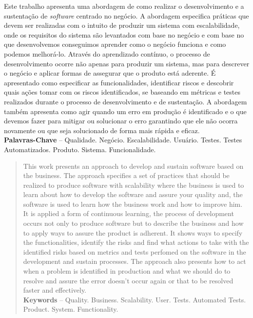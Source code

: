 \begin{resumo}
  Este trabalho apresenta uma abordagem de como realizar o desenvolvimento e
  a sustentação de \textit{software} centrado no negócio. A abordagem especifica
  práticas que devem ser realizadas com o intuito de produzir um sistema com
  escalabilidade, onde os requisitos do sistema são levantados com base no negócio
  e com base no que desenvolvemos conseguimos aprender como o negócio funciona e
  como podemos melhorá-lo. Através do aprendizado contínuo, o processo de
  desenvolvimento ocorre não apenas para produzir um sistema, mas para descrever
  o negócio e aplicar formas de assegurar que o produto está aderente. É apresentado
  como especificar as funcionalidades, identificar riscos e descobrir quais ações
  tomar com os riscos identificados, se baseando em métricas e testes realizados
  durante o processo de desenvolvimento e de sustentação. A abordagem também apresenta
  como agir quando um erro em produção é identificado e o que devemos fazer para mitigar
  ou solucionar o erro garantindo que ele não ocorra novamente ou que seja solucionado
  de forma mais rápida e eficaz. \\[3\baselineskip]

  \textbf{Palavras-Chave} -- Qualidade. Negócio. Escalabilidade. Usuário. Testes.
  Testes Automatizados. Produto. Sistema. Funcionalidade.
\end{resumo}

\begin{abstract}
  This work presents an approach to develop and sustain software based on the
  business. The approach specifies a set of practices that should be realized to
  produce software with scalability where the business is used to learn about how
  to develop the software and assure your quality and, the software is used to learn
  how the business work and how to improve him. It is applied a form of continuous
  learning, the process of development occurs not only to produce software but
  to describe the business and how to apply ways to assure the product is adherent.
  It shows ways to specify the functionalities, identify the risks and find what
  actions to take with the identified risks based on metrics and tests perfomed on
  the software in the development and sustain processes. The approach also presents
  how to act when a problem is identified in production and what we should do to
  resolve and assure the error doesn't occur again or that to be resolved faster
  and effectively. \\[3\baselineskip]

  \textbf{Keywords} -- Quality. Business. Scalability. User. Tests.
  Automated Tests. Product. System. Functionality.
\end{abstract}
